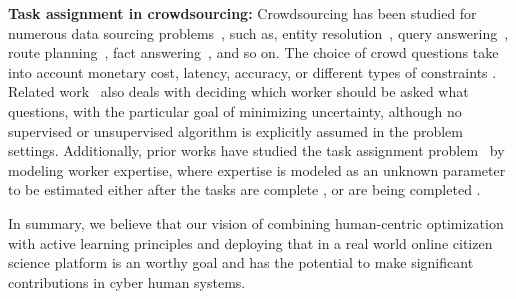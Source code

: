 {\bf Task assignment in crowdsourcing:} 
Crowdsourcing has been studied for numerous data sourcing problems~\cite{datasourcing}, such as, entity resolution~\cite{entity-resolution,DBLP:journals/corr/RekatsinasDP15}, query answering~\cite{qp1,qp2}, route planning~\cite{boim2012asking,routeplan}, fact answering~\cite{factanswering}, and so on. The choice of crowd questions take into account monetary cost, latency, accuracy, or different types of constraints \cite{ chienJuHo,kargerBudget,roy2015task}. Related work~\cite{qp2} also deals with deciding which worker should be asked what questions, with the particular goal of minimizing uncertainty, although no supervised or unsupervised algorithm is explicitly assumed in the problem settings. Additionally, prior works have studied the task assignment problem~\cite{qasca,icrowd} by modeling worker expertise, where expertise is modeled as an unknown parameter to be estimated either after the tasks are complete \cite{whitehill,kddcrowd}, or are being completed \cite{vempaty2013reliable, qp1, qp2}. %

\smallskip In summary, we believe that our vision of combining human-centric optimization with active learning principles  and deploying that in a real world online citizen science platform is an worthy goal and has the potential to make significant contributions in cyber human systems.


